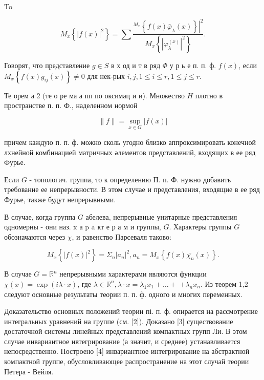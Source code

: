 \documentclass[10pt]{article}
\begin{document}
To



\[

M_{x}\left\{|f(x)|^{2}\right\}=\sum \frac{\left.{ }^{M_{x}}\left\{f(x) \bar{\varphi}_{\lambda}(x)\right\}\right|^{2}}{M_{x}\left\{\left|\varphi_{\lambda}^{(x)}\right|^{2}\right\}} .

\]



Говорят, что представление $g \in S$ в х од и т в ряд $\Phi$ у р ь е п. п. ф. $f(x)$, если $M_{x}\left\{f(x) \bar{g}_{i j}(x)\right\} \neq 0$ для нек-рых $i, j, 1 \leqslant i \leqslant r, 1 \leqslant j \leqslant r$.



Те орем а 2 (те о ре ма а пп по оксимац и и). Множество $H$ плотно в пространстве п. п. Ф., наделенном нормой



\[

\|f\|=\sup _{x \in G}|f(x)|

\]



причем каждую п. п. ф. можно сколь угодно близко аппроксимировать конечной лхнейной комбинацией матричных әлементов представлений, входящих в ее ряд Фурье.



Если $G$ - топологич. группа, то к определению П. п. Ф. нужно добавить требование ее непрерывности. В этом случае и представления, входящие в ее ряд Фурье, также будут непрерывными.



В случае, когда группа $G$ абелева, непрерывные унитарные представления одномерны - они наз. $\mathrm{x}$ а p a кт е р а м и группы, $G$. Характеры группы $G$ обозначаются через $\chi$, и равенство Парсеваля таково:



\[

M_{x}\left\{|f(x)|^{2}\right\}=\Sigma_{n}\left|a_{n}\right|^{2}, a_{n}=M_{x}\left\{f(x) \overline{\chi_{n}}(x)\right\} .

\]



В случае $G=\mathbb{R}^{n}$ непрерывными характерами являются функции $\chi(x)=\exp (i \lambda \cdot x)$, где $\lambda \in \mathbb{R}^{n}, \lambda \cdot x=\lambda_{1} x_{1}+\ldots+$ $+\lambda_{n} x_{n}$. Из теорем 1,2 следуют основные результаты теории п. п. ф. одного и многих переменных.



Доказательство основных положений теории пі. п. ф. опирается на рассмотрение интегральных уравнений на группе (см. [2]). Доказано [3] существование достаточной системы линейных представлений компактных групп Ли. В этом случае инвариантное ивтегрирование (а значит, и среднее) устанавливается непосредственно. Построено [4] инвариантное интегрирование на абстрактной компактной группе, обусловливающее распространение на этот случай теории Петера - Вейля.
\end{document}
